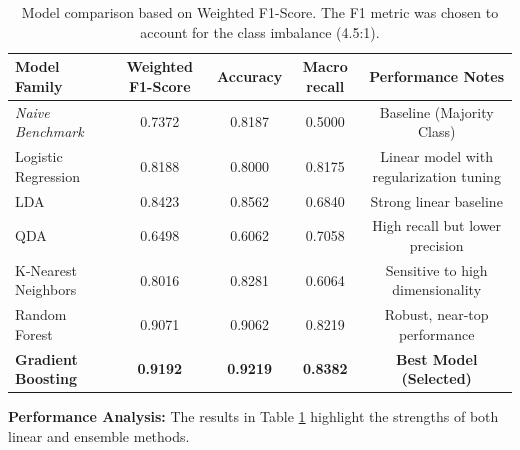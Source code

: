 \documentclass{article}
\begin{document}
\begin{table}[h]
    \centering
    \caption{Model comparison based on Weighted F1-Score. The F1 metric was chosen to account for the class imbalance (4.5:1).}
    \label{tab:results}
    \begin{tabular}{lcccc}
        \toprule
        \textbf{Model Family} & \textbf{Weighted F1-Score} & \textbf{Accuracy} & \textbf{Macro recall} & \textbf{Performance Notes} \\
        \midrule
        \textit{Naive Benchmark} & 0.7372 & 0.8187 & 0.5000 & Baseline (Majority Class) \\
        \midrule
        Logistic Regression & 0.8188 & 0.8000 & 0.8175 & Linear model with regularization tuning \\
        LDA & 0.8423 & 0.8562 & 0.6840 & Strong linear baseline \\
        QDA & 0.6498 & 0.6062 & 0.7058 & High recall but lower precision \\
        \midrule
        K-Nearest Neighbors & 0.8016 & 0.8281 & 0.6064 & Sensitive to high dimensionality \\
        \midrule
        Random Forest & 0.9071 & 0.9062 & 0.8219 & Robust, near-top performance \\
        \textbf{Gradient Boosting} & \textbf{0.9192} & \textbf{0.9219} & \textbf{0.8382} & \textbf{Best Model (Selected)} \\
        \bottomrule
    \end{tabular}
\end{table}




\textbf{Performance Analysis:} 
The results in Table \ref{tab:results} highlight the strengths of both linear and ensemble methods.
\end{document}
